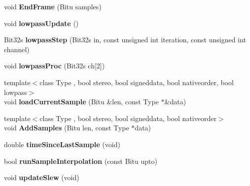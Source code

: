 \begin{DoxyCompactItemize}
\item 
\hypertarget{classMixerChannel_ac4912fcd7fdb31df56fc9f65ff517265}{void {\bfseries End\-Frame} (Bitu samples)}\label{classMixerChannel_ac4912fcd7fdb31df56fc9f65ff517265}

\item 
\hypertarget{classMixerChannel_a701ff1e9c1e386b040bc43f09b6efa20}{void {\bfseries lowpass\-Update} ()}\label{classMixerChannel_a701ff1e9c1e386b040bc43f09b6efa20}

\item 
\hypertarget{classMixerChannel_aaf27dd44013a941fcb2e2f8ff529d2a8}{Bit32s {\bfseries lowpass\-Step} (Bit32s in, const unsigned int iteration, const unsigned int channel)}\label{classMixerChannel_aaf27dd44013a941fcb2e2f8ff529d2a8}

\item 
\hypertarget{classMixerChannel_abe3d32baaf2d7a1e158691b66c3cd263}{void {\bfseries lowpass\-Proc} (Bit32s ch\mbox{[}2\mbox{]})}\label{classMixerChannel_abe3d32baaf2d7a1e158691b66c3cd263}

\item 
\hypertarget{classMixerChannel_ad8f9238e83e1806b369d0d0aa15e6ea9}{{\footnotesize template$<$class Type , bool stereo, bool signeddata, bool nativeorder, bool lowpass$>$ }\\void {\bfseries load\-Current\-Sample} (Bitu \&len, const Type $\ast$\&data)}\label{classMixerChannel_ad8f9238e83e1806b369d0d0aa15e6ea9}

\item 
\hypertarget{classMixerChannel_a4bfb1a6ad50d4c9a04a212b731cba7b4}{{\footnotesize template$<$class Type , bool stereo, bool signeddata, bool nativeorder$>$ }\\void {\bfseries Add\-Samples} (Bitu len, const Type $\ast$data)}\label{classMixerChannel_a4bfb1a6ad50d4c9a04a212b731cba7b4}

\item 
\hypertarget{classMixerChannel_acb6fa64394aefc3ae210c5716c25cfe2}{double {\bfseries time\-Since\-Last\-Sample} (void)}\label{classMixerChannel_acb6fa64394aefc3ae210c5716c25cfe2}

\item 
\hypertarget{classMixerChannel_a6a89abb0d5dafa7cb26b1278ea2ab1ee}{bool {\bfseries run\-Sample\-Interpolation} (const Bitu upto)}\label{classMixerChannel_a6a89abb0d5dafa7cb26b1278ea2ab1ee}

\item 
\hypertarget{classMixerChannel_a7940762a2e8a321658d49b2cf6b43301}{void {\bfseries update\-Slew} (void)}\label{classMixerChannel_a7940762a2e8a321658d49b2cf6b43301}


\end{DoxyCompactItemize}

